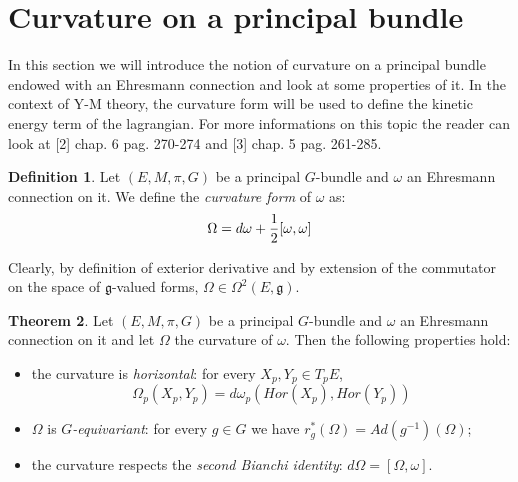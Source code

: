 \documentclass[12pt,a4paper]{report}
\theoremstyle{definition}
\newtheorem{Def}{Definition}[chapter]
\theoremstyle{Theorem}
\newtheorem{Theo}[Def]{Theorem}
\theoremstyle{definition}
\theoremstyle{definition}
\begin{document}
	\section{Curvature on a principal bundle}
	In this section we will introduce the notion of curvature on a principal bundle endowed with an Ehresmann connection and look at some properties of it. In the context of Y-M theory, the curvature form will be used to define the kinetic energy term of the lagrangian. For more informations on this topic the reader can look at [2] chap. 6 pag. 270-274 and [3] chap. 5 pag. 261-285.
	\begin{Def}
		Let $(E,M,\pi,G)$ be a principal $G$-bundle and $\omega$ an Ehresmann connection on it. We define the \textit{curvature form} of $\omega$ as:
		$$\Omega=d\omega+{1\over 2}[\omega,\omega]$$
	\end{Def}
	Clearly, by definition of exterior derivative and by extension of the commutator on the space of $\mathfrak{g}$-valued forms, $\Omega\in \Omega^2(E,\mathfrak{g})$. 
	\begin{Theo}\label{Theo_5.5.1}
		Let $(E,M,\pi,G)$ be a principal $G$-bundle and $\omega$ an Ehresmann connection on it and let $\Omega$ the curvature of $\omega$. Then the following properties hold:
		\begin{itemize}
			\item the curvature is \textit{horizontal}: for every $X_p,Y_p\in T_pE$,
			$$\Omega_p(X_p,Y_p)=d\omega_p(Hor(X_p),Hor(Y_p))$$
			\item $\Omega$ is \textit{$G$-equivariant}: for every $g\in G$ we have $r^*_g(\Omega)=Ad(g^{-1})(\Omega)$;
			\item the curvature respects the \textit{second Bianchi identity}: $d\Omega=[\Omega,\omega]$.
		\end{itemize}
	\end{Theo}
\end{document}
